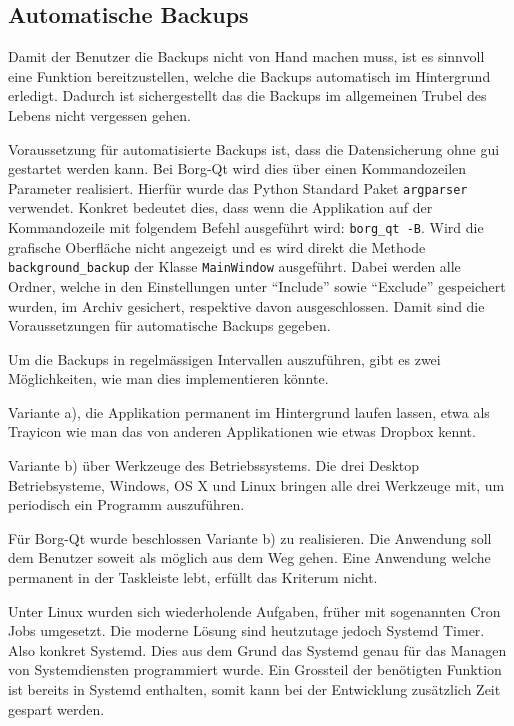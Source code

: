 \subsection{Automatische Backups}
\label{sec:org99bb44c}

Damit der Benutzer die Backups nicht von Hand machen muss, ist es sinnvoll eine
Funktion bereitzustellen, welche die Backups automatisch im Hintergrund
erledigt. Dadurch ist sichergestellt das die Backups im allgemeinen Trubel des
Lebens nicht vergessen gehen.

Voraussetzung für automatisierte Backups ist, dass die Datensicherung ohne
\gls{gui} gestartet werden kann. Bei Borg-Qt wird dies über einen Kommandozeilen
Parameter realisiert. Hierfür wurde das Python Standard Paket \texttt{argparser}
verwendet. Konkret bedeutet dies, dass wenn die Applikation auf der
Kommandozeile mit folgendem Befehl ausgeführt wird: \texttt{borg\_qt -B}. Wird die
grafische Oberfläche nicht angezeigt und es wird direkt die Methode
\texttt{background\_backup} der Klasse \texttt{MainWindow} ausgeführt. Dabei werden alle
Ordner, welche in den Einstellungen unter "`Include"' sowie "`Exclude"' gespeichert
wurden, im Archiv gesichert, respektive davon ausgeschlossen. Damit sind die
Voraussetzungen für automatische Backups gegeben.

Um die Backups in regelmässigen Intervallen auszuführen, gibt es zwei
Möglichkeiten, wie man dies implementieren könnte.

Variante a), die Applikation permanent im Hintergrund laufen lassen, etwa als
Trayicon wie man das von anderen Applikationen wie etwas Dropbox kennt.

Variante b) über Werkzeuge des Betriebssystems. Die drei Desktop
Betriebsysteme, Windows, OS X und Linux bringen alle drei Werkzeuge mit, um
periodisch ein Programm auszuführen.

Für Borg-Qt wurde beschlossen Variante b) zu realisieren. Die Anwendung soll
dem Benutzer soweit als möglich aus dem Weg gehen. Eine Anwendung welche
permanent in der Taskleiste lebt, erfüllt das Kriterum nicht.

Unter Linux wurden sich wiederholende Aufgaben, früher mit sogenannten Cron
Jobs umgesetzt. Die moderne Lösung sind heutzutage jedoch Systemd Timer. Also
konkret Systemd. Dies aus dem Grund das Systemd genau für das Managen von
Systemdiensten programmiert wurde. Ein Grossteil der benötigten Funktion ist
bereits in Systemd enthalten, somit kann bei der Entwicklung zusätzlich Zeit
gespart werden.

